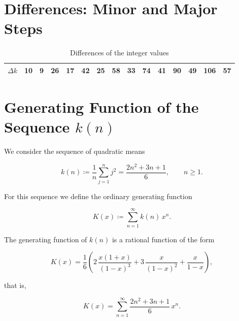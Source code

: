 \section{Differences: Minor and Major Steps}

\begin{table}[htbp]
\centering
\caption{Differences of the integer values}
\begin{tabular}{*{15}{c}}
\toprule
$\Delta k$ & 10 & 9 & 26 & 17 & 42 & 25 & 58 & 33 & 74 & 41 & 90 & 49 & 106 & 57 \\
\bottomrule
\end{tabular}
\end{table}

\section{Generating Function of the Sequence \texorpdfstring{$k(n)$}{k(n)}}

We consider the sequence of quadratic means


\[
  k(n) \coloneqq \frac{1}{n}\sum_{j=1}^{n} j^{2}
  = \frac{2n^{2} + 3n + 1}{6}, \qquad n \ge 1.
\]



For this sequence we define the ordinary generating function


\[
  K(x) \coloneqq \sum_{n=1}^{\infty} k(n)\,x^{n}.
\]



\begin{theorem}
The generating function of $k(n)$ is a rational function of the form


\[
  K(x)
  = \frac{1}{6}\left(
      2\,\frac{x(1+x)}{(1-x)^{3}}
      + 3\,\frac{x}{(1-x)^{2}}
      + \frac{x}{1-x}
    \right),
\]


that is,


\[
  K(x) = \sum_{n=1}^{\infty} \frac{2n^{2} + 3n + 1}{6}\,x^{n}.
\]


\end{theorem}

